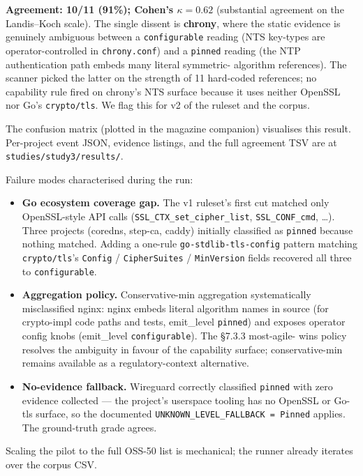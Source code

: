 \textbf{Agreement: 10/11 (91\%); Cohen's \(\kappa = 0.62\)} (substantial
agreement on the Landis--Koch scale). The single dissent is
\textbf{chrony}, where the static evidence is genuinely ambiguous
between a \texttt{configurable} reading (NTS key-types are
operator-controlled in \texttt{chrony.conf}) and a \texttt{pinned}
reading (the NTP authentication path embeds many literal symmetric-
algorithm references). The scanner picked the latter on the strength of
11 hard-coded references; no capability rule fired on chrony's NTS
surface because it uses neither OpenSSL nor Go's \texttt{crypto/tls}. We
flag this for v2 of the ruleset and the corpus.

The confusion matrix (plotted in the magazine companion) visualises this
result. Per-project event JSON, evidence listings, and the full
agreement TSV are at \texttt{studies/study3/results/}.

Failure modes characterised during the run:

\begin{itemize}
\tightlist
\item
  \textbf{Go ecosystem coverage gap.} The v1 ruleset's first cut matched
  only OpenSSL-style API calls (\texttt{SSL\_CTX\_set\_cipher\_list},
  \texttt{SSL\_CONF\_cmd}, \ldots). Three projects (coredns, step-ca,
  caddy) initially classified as \texttt{pinned} because nothing
  matched. Adding a one-rule \texttt{go-stdlib-tls-config} pattern
  matching \texttt{crypto/tls}'s \texttt{Config} / \texttt{CipherSuites}
  / \texttt{MinVersion} fields recovered all three to
  \texttt{configurable}.
\item
  \textbf{Aggregation policy.} Conservative-min aggregation
  systematically misclassified nginx: nginx embeds literal algorithm
  names in source (for crypto-impl code paths and tests, emit\_level
  \texttt{pinned}) and exposes operator config knobs (emit\_level
  \texttt{configurable}). The §7.3.3 most-agile- wins policy resolves
  the ambiguity in favour of the capability surface; conservative-min
  remains available as a regulatory-context alternative.
\item
  \textbf{No-evidence fallback.} Wireguard correctly classified
  \texttt{pinned} with zero evidence collected --- the project's
  userspace tooling has no OpenSSL or Go-tls surface, so the documented
  \texttt{UNKNOWN\_LEVEL\_FALLBACK\ =\ Pinned} applies. The ground-truth
  grade agrees.
\end{itemize}

Scaling the pilot to the full OSS-50 list is mechanical; the runner
already iterates over the corpus CSV.

